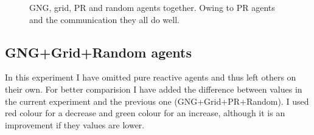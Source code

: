 

\begin{figure}[h!]
  \centering        
  \caption{GNG, grid, PR and random agents together. Owing to PR agents and the communication they all do well.}
\end{figure}
       
\clearpage
                                
\subsection{GNG+Grid+Random agents}

In this experiment I have omitted pure reactive agents and thus left others on their own. For better comparision I have added the difference between values in the current experiment and the previous one (GNG+Grid+PR+Random). I used red colour for a decrease and green colour for an increase, although it is an improvement if they values are lower.         
            
